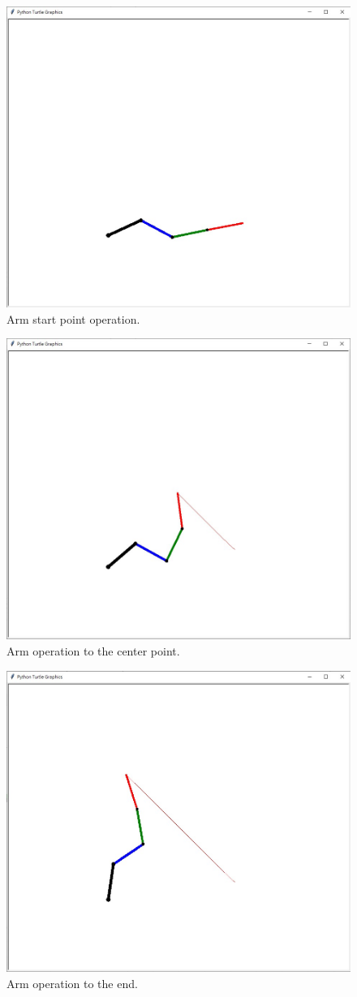 \documentclass[journal,article,submit,pdftex,moreauthors]{Definitions/mdpi}
\begin{document}
\begin{figure}[H]
\includegraphics[width=10.5 cm]{Definitions/fig4}
\caption{Arm start point operation. \label{fig4}}
\end{figure}   

\begin{figure}[H]
\includegraphics[width=10.5 cm]{Definitions/fig5}
\caption{Arm operation to the center point. \label{fig5}}
\end{figure}   

\begin{figure}[H]
\includegraphics[width=10.5 cm]{Definitions/fig6}
\caption{Arm operation to the end. \label{fig6}}
\end{figure}   
\end{document}
